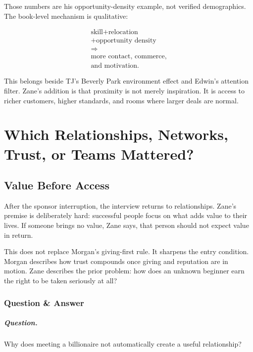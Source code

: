 \documentclass[11pt,oneside]{book}
\begin{document}
Those numbers are his opportunity-density example, not verified demographics. The book-level mechanism is qualitative:

\begin{equation}
\begin{gathered}
\text{skill}+\text{relocation}\\
+\text{opportunity density}\\
\Rightarrow\\
\text{more contact, commerce,}\\
\text{and motivation}.
\end{gathered}
\end{equation}

This belongs beside TJ's Beverly Park environment effect and Edwin's attention filter. Zane's addition is that proximity is not merely inspiration. It is access to richer customers, higher standards, and rooms where larger deals are normal.

\chapter{Which Relationships, Networks, Trust, or Teams Mattered?}

\section{Value Before Access}

After the sponsor interruption, the interview returns to relationships. Zane's premise is deliberately hard: successful people focus on what adds value to their lives. If someone brings no value, Zane says, that person should not expect value in return.

This does not replace Morgan's giving-first rule. It sharpens the entry condition. Morgan describes how trust compounds once giving and reputation are in motion. Zane describes the prior problem: how does an unknown beginner earn the right to be taken seriously at all?

\subsection{Question \& Answer}

\paragraph{Question.}
Why does meeting a billionaire not automatically create a useful relationship?
\end{document}
